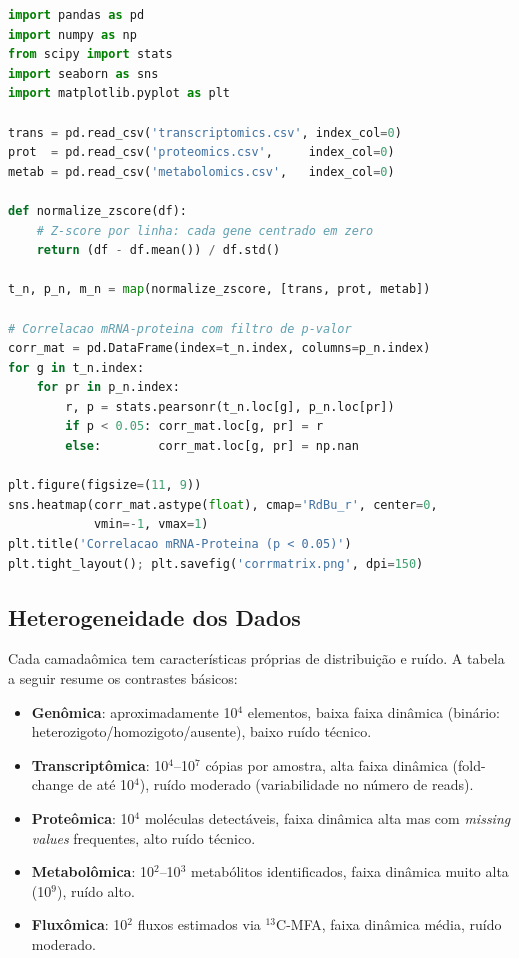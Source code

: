 \begin{lstlisting}[language=Python, caption=Integracao multi-omica simples]
import pandas as pd
import numpy as np
from scipy import stats
import seaborn as sns
import matplotlib.pyplot as plt

trans = pd.read_csv('transcriptomics.csv', index_col=0)
prot  = pd.read_csv('proteomics.csv',     index_col=0)
metab = pd.read_csv('metabolomics.csv',   index_col=0)

def normalize_zscore(df):
    # Z-score por linha: cada gene centrado em zero
    return (df - df.mean()) / df.std()

t_n, p_n, m_n = map(normalize_zscore, [trans, prot, metab])

# Correlacao mRNA-proteina com filtro de p-valor
corr_mat = pd.DataFrame(index=t_n.index, columns=p_n.index)
for g in t_n.index:
    for pr in p_n.index:
        r, p = stats.pearsonr(t_n.loc[g], p_n.loc[pr])
        if p < 0.05: corr_mat.loc[g, pr] = r
        else:        corr_mat.loc[g, pr] = np.nan

plt.figure(figsize=(11, 9))
sns.heatmap(corr_mat.astype(float), cmap='RdBu_r', center=0,
            vmin=-1, vmax=1)
plt.title('Correlacao mRNA-Proteina (p < 0.05)')
plt.tight_layout(); plt.savefig('corrmatrix.png', dpi=150)
\end{lstlisting}

\subsection{Heterogeneidade dos Dados}
\label{sub:image11-heterogeneidade}

Cada camadaômica tem características próprias de distribuição e ruído. A
tabela a seguir resume os contrastes básicos:

\begin{itemize}
\item \textbf{Genômica}: aproximadamente 10$^4$ elementos, baixa faixa
  dinâmica (binário: heterozigoto/homozigoto/ausente), baixo ruído técnico.
\item \textbf{Transcriptômica}: 10$^4$--10$^7$ cópias por amostra, alta faixa
  dinâmica (fold-change de até 10$^4$), ruído moderado (variabilidade no
  número de reads).
\item \textbf{Proteômica}: 10$^4$ moléculas detectáveis, faixa dinâmica alta
  mas com \emph{missing values} frequentes, alto ruído técnico.
\item \textbf{Metabolômica}: 10$^2$--10$^3$ metabólitos identificados, faixa
  dinâmica muito alta (10$^9$), ruído alto.
\item \textbf{Fluxômica}: 10$^2$ fluxos estimados via $^{13}$C-MFA, faixa
  dinâmica média, ruído moderado.
\end{itemize}

